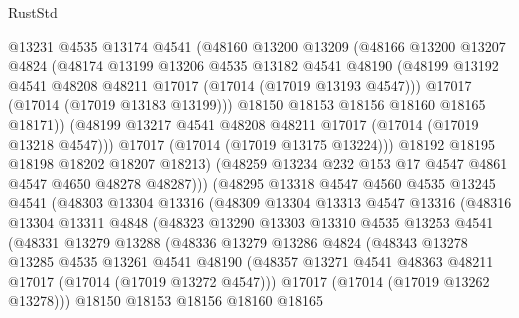\begin{lexlean}{RustStd}
\begin{coremodule}
{\begin{coremodule}
{{{{{{{{{{{{{{{{{{{{{{{{{{{{{{{{{{{{{{{{{{{{{{{{{{{{{{{                  @13231
                  @4535
                  @13174
                  @4541
                  (@48160
                    @13200
                    @13209
                    (@48166
                      @13200
                      @13207
                      @4824
                      (@48174
                        @13199
                        @13206
                        @4535
                        @13182
                        @4541
                        @48190
                        (@48199 @13192 @4541 @48208 @48211 @17017 (@17014 (@17019 @13193 @4547)))
                        @17017
                        (@17014 (@17019 @13183 @13199)))
                      @18150
                      @18153
                      @18156
                      @18160
                      @18165
                      @18171))
                  (@48199 @13217 @4541 @48208 @48211 @17017 (@17014 (@17019 @13218 @4547)))
                  @17017
                  (@17014 (@17019 @13175 @13224)))
                @18192
                @18195
                @18198
                @18202
                @18207
                @18213)
              (@48259 @13234 @232 @153 @17 @4547 @4861 @4547 @4650 @48278 @48287)))
          (@48295
            @13318
            @4547
            @4560
            @4535
            @13245
            @4541
            (@48303
              @13304
              @13316
              (@48309
                @13304
                @13313
                @4547
                @13316
                (@48316
                  @13304
                  @13311
                  @4848
                  (@48323
                    @13290
                    @13303
                    @13310
                    @4535
                    @13253
                    @4541
                    (@48331
                      @13279
                      @13288
                      (@48336
                        @13279
                        @13286
                        @4824
                        (@48343
                          @13278
                          @13285
                          @4535
                          @13261
                          @4541
                          @48190
                          (@48357 @13271 @4541 @48363 @48211 @17017 (@17014 (@17019 @13272 @4547)))
                          @17017
                          (@17014 (@17019 @13262 @13278)))
                        @18150
                        @18153
                        @18156
                        @18160
                        @18165
}}}}}}}}}}}}}}}}}}}}}}}}}}}}}}}}}}}}}}}}}}}}}}}}}}}}}}}
\end{coremodule}}
\end{coremodule}
\end{lexlean}
